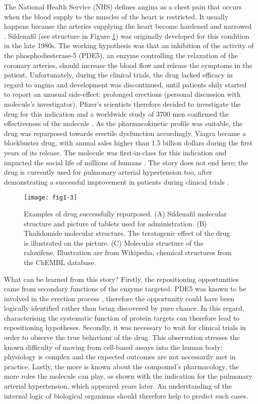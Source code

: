 The National Health Service (NHS) defines angina as a chest pain that occurs when the blood supply to the muscles of the heart is restricted. It usually happens because the arteries supplying the heart become hardened and narrowed \citep{anginanhs}. Sildenafil (see structure in Figure \ref{fig1-3}) was originally developed for this condition in the late 1980s. The working hypothesis was that an inhibition of the activity of the phosphodiesterase-5 (PDE5), an enzyme controlling the relaxation of the coronary arteries, should increase the blood flow and release the symptoms in the patient. Unfortunately, during the clinical trials, the drug lacked efficacy in regard to angina and development was discontinued, until patients shily started to report an unusual side-effect: prolonged erections (personal discussion with molecule's investigator). Pfizer's scientists therefore decided to investigate the drug for this indication and a worldwide study of 3700 men confirmed the effectiveness of the molecule \citep{nytimes}. As the pharmacokinetic profile was suitable, the drug was repurposed towards erectile dysfunction accordingly. Viagra became a blockbuster drug, with annual sales higher than 1.5 billion dollars \citep{renaud2002erectile} during the first years of its release. The molecule was first-in-class for this indication and impacted the social life of millions of humans \citep{renaud2002erectile}. The story does not end here; the drug is currently used for pulmonary arterial hypertension too, after demonstrating a successful improvement in patients during clinical trials \citep{ghofrani2006sildenafil}.

\begin{figure}[ht]
    \centering
    \texttt{[image: fig1-3]}
    \caption{Examples of drug successfully repurposed. (A) Sildenafil molecular structure and picture of tablets used for administration. (B) Thalidomide molecular structure. The teratogenic effect of the drug is illustrated on the picture. (C) Molecular structure of the raloxifene. Illustration are from Wikipedia, chemical structures from the ChEMBL database.}
    \label{fig1-3}
\end{figure}

What can be learned from this story? Firstly, the repositioning opportunities came from secondary functions of the enzyme targeted. PDE5 was known to be involved in the erection process \citep{krall1988characterization}, therefore the opportunity could have been logically identified rather than being discovered by pure chance. In this regard, characterising the systematic function of protein targets can therefore lead to repositioning hypotheses. Secondly, it was necessary to wait for clinical trials in order to observe the true behaviour of the drug. This observation stresses the known difficulty of moving from cell-based assays into the human body: physiology is complex and the expected outcomes are not necessarily met in practice. Lastly, the more is known about the compound’s pharmacology, the more roles the molecule can play, as shown with the indication for the pulmonary arterial hypertension, which appeared years later. An understanding of the internal logic of biological organisms should therefore help to predict such cases.


